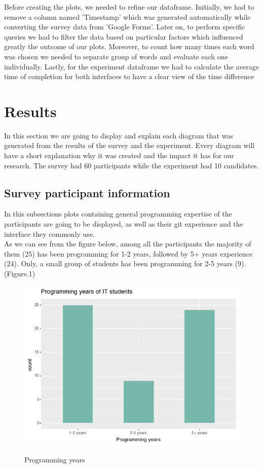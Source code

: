 \documentclass[]{report}
\begin{document}
	Before creating the plots, we needed to refine our dataframe. Initially, we had to remove a column named 'Timestamp' which was generated automatically while converting the survey data from 'Google Forms'. Later on, to perform specific queries we had to filter the data based on particular factors which influenced greatly the outcome of our plots. Moreover, to count how many times each word was chosen we needed to separate group of words and evaluate each one individually. Lastly, for the experiment dataframe we had to calculate the average time of completion for both interfaces to have a clear view of the time difference
	\section{Results}
	In this section we are going to display and explain each diagram that was generated from the results of the survey and the experiment. Every diagram will have a short explanation why it was created and the impact it has for our research. The survey had 60 participants while the experiment had 10 candidates. 
	
	\subsection{Survey participant information}
	In this subsections plots containing general programming expertise of the participants are going to be displayed, as well as their git experience and the interface they commonly use.\\
	
	As we can see from the figure below, among all the participants the majority of them (25) has been programming for 1-2 years, followed by 5+ years experience (24). Only, a small group of students has been programming for 2-5 years (9). (Figure.1)
	
	\begin{figure}[H]
		\centering
		\includegraphics[width=0.75\linewidth]{ProgrammingYears}\\
		\caption{Programming years}
		\label{fig:  1}
	\end{figure}
	
\end{document}
